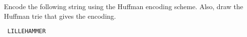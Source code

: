 Encode the following string using the Huffman encoding scheme.  Also,
draw the Huffman trie that gives the encoding.
\begin{center}\tt
LILLEHAMMER
\end{center}
